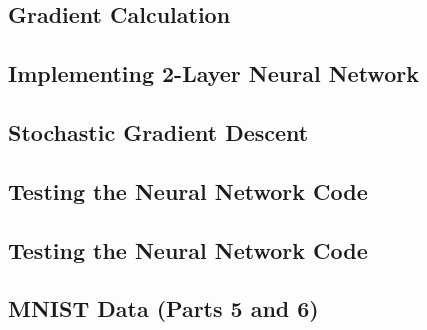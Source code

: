\documentclass[10pt]{article}
\begin{document}
\subsection*{Gradient Calculation}



\subsection*{Implementing 2-Layer Neural Network}

\subsection*{Stochastic Gradient Descent}

\subsection*{Testing the Neural Network Code}

\subsection*{Testing the Neural Network Code}

\subsection*{MNIST Data (Parts 5 and 6)}
\end{document}
